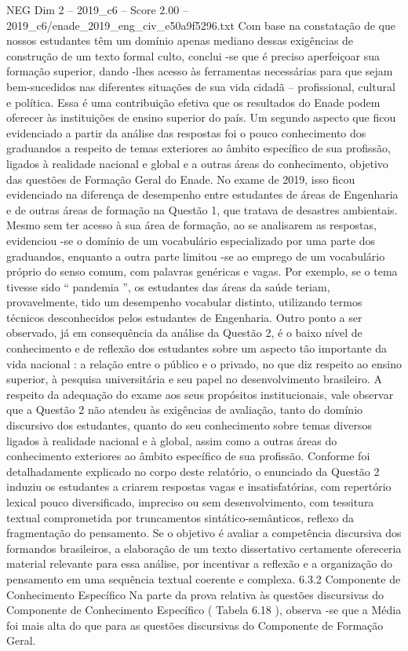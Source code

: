 \begin{textsample}{NEG Dim 2 – 2019\_c6 – Score 2.00 – 2019\_c6/enade\_2019\_eng\_civ\_e50a9f5296.txt}
Com base na constatação de que nossos estudantes têm um domínio apenas mediano dessas exigências de construção de um texto formal culto, conclui -se que é preciso aperfeiçoar sua formação superior, dando -lhes acesso às ferramentas necessárias para que sejam bem-sucedidos nas diferentes situações de sua vida cidadã – profissional, cultural e política.
Essa é uma contribuição efetiva que os resultados do Enade podem oferecer às instituições de ensino superior do país.
Um segundo aspecto que ficou evidenciado a partir da análise das respostas foi o pouco conhecimento dos graduandos a respeito de temas exteriores ao âmbito específico de sua profissão, ligados à realidade nacional e global e a outras áreas do conhecimento, objetivo das questões de Formação Geral do Enade.
No exame de 2019, isso ficou evidenciado na diferença de desempenho entre estudantes de áreas de Engenharia e de outras áreas de formação na Questão 1, que tratava de desastres ambientais.
Mesmo sem ter acesso à sua área de formação, ao se analisarem as respostas, evidenciou -se o domínio de um vocabulário especializado por uma parte dos graduandos, enquanto a outra parte limitou -se ao emprego de um vocabulário próprio do senso comum, com palavras genéricas e vagas.
Por exemplo, se o tema tivesse sido “ pandemia ”, os estudantes das áreas da saúde teriam, provavelmente, tido um desempenho vocabular distinto, utilizando termos técnicos desconhecidos pelos estudantes de Engenharia.
Outro ponto a ser observado, já em consequência da análise da Questão 2, é o baixo nível de conhecimento e de reflexão dos estudantes sobre um aspecto tão importante da vida nacional : a relação entre o público e o privado, no que diz respeito ao ensino superior, à pesquisa universitária e seu papel no desenvolvimento brasileiro.
A respeito da adequação do exame aos seus propósitos institucionais, vale observar que a Questão 2 não atendeu às exigências de avaliação, tanto do domínio discursivo dos estudantes, quanto do seu conhecimento sobre temas diversos ligados à realidade nacional e à global, assim como a outras áreas do conhecimento exteriores ao âmbito específico de sua profissão.
Conforme foi detalhadamente explicado no corpo deste relatório, o enunciado da Questão 2 induziu os estudantes a criarem respostas vagas e insatisfatórias, com repertório lexical pouco diversificado, impreciso ou sem desenvolvimento, com tessitura textual comprometida por truncamentos sintático-semânticos, reflexo da fragmentação do pensamento.
Se o objetivo é avaliar a competência discursiva dos formandos brasileiros, a elaboração de um texto dissertativo certamente ofereceria material relevante para essa análise, por incentivar a reflexão e a organização do pensamento em uma sequência textual coerente e complexa. 6.3.2 Componente de Conhecimento Específico Na parte da prova relativa às questões discursivas do Componente de Conhecimento Específico ( Tabela 6.18 ), observa -se que a Média foi mais alta do que para as questões discursivas do Componente de Formação Geral.

\end{textsample}
